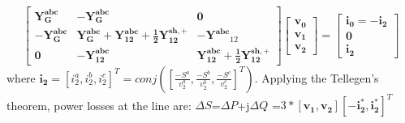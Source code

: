 \documentclass[12pt]{article}
\begin{document}
\begin{equation}
 \left[ \begin{array}{ccc}\label{4}
 \mathbf{{Y}^{abc}_{G}} & - \mathbf{{Y}^{abc}_{G}}  &\mathbf{0} \\
 - \mathbf{{Y}^{abc}_{G}} &  \mathbf{{Y}^{abc}_{G}+{Y}^{abc}_{12}+\frac{1}{2}{Y}^{sh,+}_{12}} & -\mathbf{{Y}^{abc}}_{12}\\
 \mathbf{0} & -\mathbf{{Y}^{abc}_{12}} & \mathbf{{Y}^{abc}_{12}+\frac{1}{2}{Y}^{sh,+}_{12}}
             \end{array}
           \right]
  \begin{bmatrix}
  \bm{v_0}\\
	\bm{v_1}\\
	\bm{v_2}
\end{bmatrix}
  =
  \begin{bmatrix}
\bm{i_0}=-\bm{i_2}\\
\bm{0}\\
\bm{i_2}
\end{bmatrix}
  \end{equation}
where $\bm{i_2}=[i^a_2, i^b_2,i^c_2]^T=conj([\frac{-{S^a}}{{v}^a_2},\frac{-{S^b}}{{v}^b_2},\frac{-{S^c}}{{v}^c_2}]^T)$. Applying the Tellegen's theorem, power losses at the line are: $\Delta {S}$=$\Delta P$+j$\Delta Q$
=$3*[\bm{v_1},\bm{v_2}][-\bm{i^*_2},\bm{i^*_2}]^T$
\end{document}
